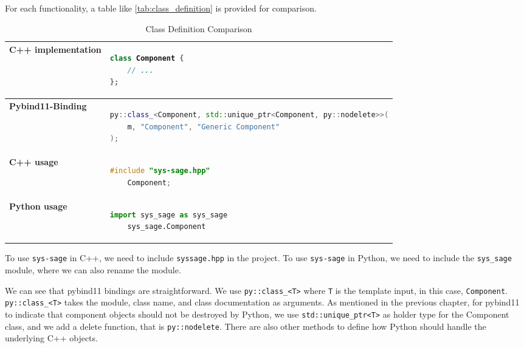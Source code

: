 For each functionality, a table like \autoref{tab:class_definition} is provided for comparison.
        
\begin{table}[ht]
\centering
\begin{tabular}{|l|l|}
\hline
\textbf{C++ implementation} &
\begin{lstlisting}[language=C++]
class Component {
    // ...
};
\end{lstlisting}
\\ \hline
\textbf{Pybind11-Binding} &
\begin{lstlisting}[language=C++]
py::class_<Component, std::unique_ptr<Component, py::nodelete>>(
    m, "Component", "Generic Component"
);
\end{lstlisting}
\\ \hline
\textbf{C++ usage} &
\begin{lstlisting}[language=C++]
    #include "sys-sage.hpp"
    Component;
\end{lstlisting}
    \\ \hline
\textbf{Python usage} &
\begin{lstlisting}[language=Python]
    import sys_sage as sys_sage
    sys_sage.Component
    \end{lstlisting}
    \\ \hline
\end{tabular}
\caption{Class Definition Comparison}
\label{tab:class_definition}
\end{table}

To use \verb|sys-sage| in C++, we need to include \verb|syssage.hpp| in the project. To use \verb|sys-sage| in Python, we need to include the \verb|sys_sage| module, where we can also rename the module. 

We can see that pybind11 bindings are straightforward. We use \verb|py::class_<T>| where \verb|T| is the template input, in this case, \verb|Component|. \verb|py::class_<T>| takes the module, class name, and class documentation as arguments. As mentioned in the previous chapter, for pybind11 to indicate that component objects should not be destroyed by Python, we use \verb|std::unique_ptr<T>| as holder type for the Component class, and we add a delete function, that is \verb|py::nodelete|. There are also other methods to define how Python should handle the underlying C++ objects. \cite[see The Basics/Object-Oriented Code]{pybind11-docu}




